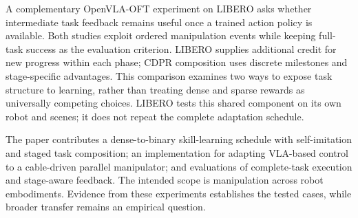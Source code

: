 A complementary OpenVLA-OFT experiment on LIBERO asks whether intermediate task feedback remains useful once a trained action policy is available. Both studies exploit ordered manipulation events while keeping full-task success as the evaluation criterion. LIBERO supplies additional credit for new progress within each phase; CDPR composition uses discrete milestones and stage-specific advantages. This comparison examines two ways to expose task structure to learning, rather than treating dense and sparse rewards as universally competing choices. LIBERO tests this shared component on its own robot and scenes; it does not repeat the complete adaptation schedule.

The paper contributes a dense-to-binary skill-learning schedule with self-imitation and staged task composition; an implementation for adapting VLA-based control to a cable-driven parallel manipulator; and evaluations of complete-task execution and stage-aware feedback. The intended scope is manipulation across robot embodiments. Evidence from these experiments establishes the tested cases, while broader transfer remains an empirical question.

